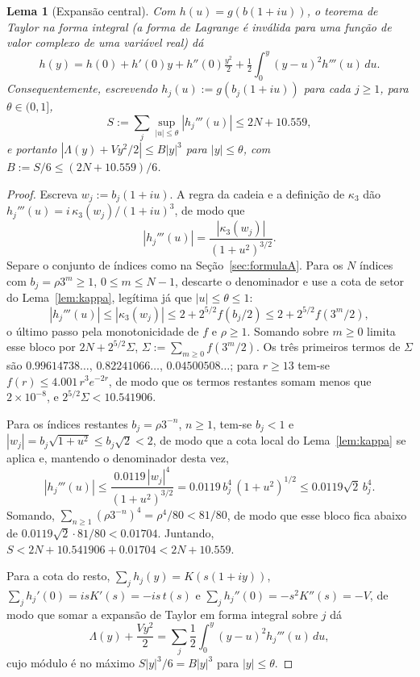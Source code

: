 \documentclass[11pt]{amsart}
\theoremstyle{plain}
\newtheorem{lemma}[theorem]{Lema}
\theoremstyle{definition}
\theoremstyle{remark}
\begin{document}
\begin{lemma}[Expansão central]
\label{lem:taylor}
Com $h(u) = g(b(1+iu))$, o teorema de Taylor na forma \emph{integral} (a forma de Lagrange é
inválida para uma função de valor complexo de uma variável real) dá
\[
h(y) = h(0)+h'(0)y+h''(0)\tfrac{y^2}{2} + \tfrac12\int_0^y (y-u)^2 h'''(u)\,du.
\]
Consequentemente, escrevendo $h_j(u) := g(b_j(1+iu))$ para cada $j\ge1$, para $\theta\in(0,1]$,
\[
S := \sum_j \sup_{|u|\le \theta}|h_j'''(u)| \le 2N + 10.559,
\]
e portanto $|\Lambda(y) + Vy^2/2| \le B|y|^3$ para $|y|\le \theta$, com $B := S/6 \le (2N+10.559)/6$.
\end{lemma}

\begin{proof}
Escreva $w_j := b_j(1+iu)$. A regra da cadeia e a definição de $\kappa_3$ dão $h_j'''(u) = i\,
\kappa_3(w_j)/(1+iu)^3$, de modo que
\[
|h_j'''(u)| = \frac{|\kappa_3(w_j)|}{(1+u^2)^{3/2}}.
\]
Separe o conjunto de índices como na Seção~\ref{sec:formulaA}. Para os $N$ índices com
$b_j = \rho3^m \ge 1$, $0\le m\le N-1$, descarte o denominador e use a cota de setor do
Lema~\ref{lem:kappa}, legítima já que $|u|\le\theta\le1$:
\[
|h_j'''(u)| \le |\kappa_3(w_j)| \le 2 + 2^{5/2} f(b_j/2) \le 2 + 2^{5/2} f(3^m/2),
\]
o último passo pela monotonicidade de $f$ e $\rho\ge1$. Somando sobre $m\ge0$ limita esse bloco por
$2N + 2^{5/2}\Sigma$, $\Sigma := \sum_{m\ge0} f(3^m/2)$. Os três primeiros termos de $\Sigma$ são
$0.99614738\ldots$, $0.82241066\ldots$, $0.04500508\ldots$; para $r\ge13$ tem-se $f(r) \le
4.001\,r^3e^{-2r}$, de modo que os termos restantes somam menos que $2\times10^{-8}$, e
$2^{5/2}\Sigma < 10.541906$.

Para os índices restantes $b_j = \rho 3^{-n}$, $n\ge1$, tem-se $b_j<1$ e $|w_j| =
b_j\sqrt{1+u^2} \le b_j\sqrt2 < 2$, de modo que a cota local do Lema~\ref{lem:kappa} se aplica e,
mantendo o denominador desta vez,
\[
|h_j'''(u)| \le \frac{0.0119\,|w_j|^4}{(1+u^2)^{3/2}} = 0.0119\,b_j^4\,(1+u^2)^{1/2} \le
0.0119\sqrt2\,b_j^4 .
\]
Somando, $\sum_{n\ge1}(\rho3^{-n})^4 = \rho^4/80 < 81/80$, de modo que esse bloco fica abaixo de
$0.0119\sqrt2\cdot81/80 < 0.01704$. Juntando, $S < 2N + 10.541906 + 0.01704 < 2N + 10.559$.

Para a cota do resto, $\sum_j h_j(y) = K(s(1+iy))$, $\sum_j h_j'(0) = isK'(s) = -is\,t(s)$ e
$\sum_j h_j''(0) = -s^2K''(s) = -V$, de modo que somar a expansão de Taylor em forma integral sobre
$j$ dá
\[
\Lambda(y) + \frac{Vy^2}{2} = \sum_j \frac12\int_0^y (y-u)^2 h_j'''(u)\,du,
\]
cujo módulo é no máximo $S|y|^3/6 = B|y|^3$ para $|y|\le\theta$.
\end{proof}
\end{document}
